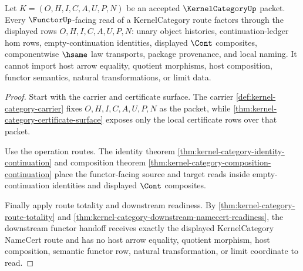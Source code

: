 \begin{theorem}
\label{thm:kernel-category-downstream-functor-route-boundary}
Let $K=(O,H,I,C,A,U,P,N)$ be an accepted $\KernelCategoryUp$ packet. Every $\FunctorUp$-facing read of a KernelCategory route factors through the displayed rows $O,H,I,C,A,U,P,N$: unary object histories, continuation-ledger hom rows, empty-continuation identities, displayed $\Cont$ composites, componentwise $\hsame$ law transports, package provenance, and local naming. It cannot import host arrow equality, quotient morphisms, host composition, functor semantics, natural transformations, or limit data.
\end{theorem}
\begin{proof}
Start with the carrier and certificate surface. The carrier \autoref{def:kernel-category-carrier} fixes $O,H,I,C,A,U,P,N$ as the packet, while \autoref{thm:kernel-category-certificate-surface} exposes only the local certificate rows over that packet.

Use the operation routes. The identity theorem \autoref{thm:kernel-category-identity-continuation} and composition theorem \autoref{thm:kernel-category-composition-continuation} place the functor-facing source and target reads inside empty-continuation identities and displayed $\Cont$ composites.

Finally apply route totality and downstream readiness. By \autoref{thm:kernel-category-route-totality} and \autoref{thm:kernel-category-downstream-namecert-readiness}, the downstream functor handoff receives exactly the displayed KernelCategory NameCert route and has no host arrow equality, quotient morphism, host composition, semantic functor row, natural transformation, or limit coordinate to read.
\end{proof}

